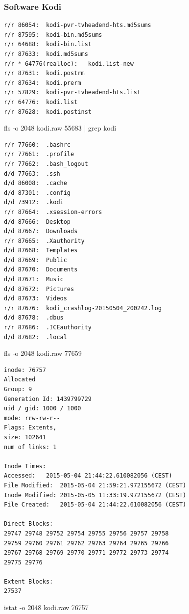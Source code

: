\subsubsection{Software Kodi}

\begin{cmd}[H]
\begin{verbatim}
r/r 86054:	kodi-pvr-tvheadend-hts.md5sums
r/r 87595:	kodi-bin.md5sums
r/r 64688:	kodi-bin.list
r/r 87633:	kodi.md5sums
r/r * 64776(realloc):	kodi.list-new
r/r 87631:	kodi.postrm
r/r 87634:	kodi.prerm
r/r 57829:	kodi-pvr-tvheadend-hts.list
r/r 64776:	kodi.list
r/r 87628:	kodi.postinst
\end{verbatim}
\caption{fls -o 2048 kodi.raw 55683 | grep kodi}
\label{cmd:kodi-dpkgkodi}
\end{cmd}

\begin{cmd}[H]
\begin{verbatim}
r/r 77660:	.bashrc
r/r 77661:	.profile
r/r 77662:	.bash_logout
d/d 77663:	.ssh
d/d 86008:	.cache
d/d 87301:	.config
d/d 73912:	.kodi
r/r 87664:	.xsession-errors
d/d 87666:	Desktop
d/d 87667:	Downloads
r/r 87665:	.Xauthority
d/d 87668:	Templates
d/d 87669:	Public
d/d 87670:	Documents
d/d 87671:	Music
d/d 87672:	Pictures
d/d 87673:	Videos
r/r 87676:	kodi_crashlog-20150504_200242.log
d/d 87678:	.dbus
r/r 87686:	.ICEauthority
d/d 87682:	.local
\end{verbatim}
\caption{fls -o 2048 kodi.raw 77659}
\label{cmd:kodi-homedir}
\end{cmd}

\begin{cmd}[H]
\begin{verbatim}
inode: 76757
Allocated
Group: 9
Generation Id: 1439799729
uid / gid: 1000 / 1000
mode: rrw-rw-r--
Flags: Extents,
size: 102641
num of links: 1

Inode Times:
Accessed:	2015-05-04 21:44:22.610082056 (CEST)
File Modified:	2015-05-04 21:59:21.972155672 (CEST)
Inode Modified:	2015-05-05 11:33:19.972155672 (CEST)
File Created:	2015-05-04 21:44:22.610082056 (CEST)

Direct Blocks:
29747 29748 29752 29754 29755 29756 29757 29758
29759 29760 29761 29762 29763 29764 29765 29766
29767 29768 29769 29770 29771 29772 29773 29774
29775 29776

Extent Blocks:
27537
\end{verbatim}
\caption{istat -o 2048 kodi.raw 76757}
\label{cmd:kodi-logfileaccess}
\end{cmd}

